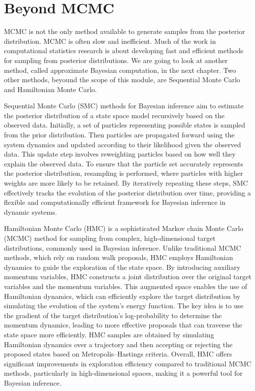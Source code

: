 \documentclass[
]{book}
\theoremstyle{definition}
\theoremstyle{definition}
\theoremstyle{definition}
\theoremstyle{definition}
\theoremstyle{remark}
\begin{document}
\section{Beyond MCMC}\label{beyond-mcmc}

MCMC is not the only method available to generate samples from the posterior distribution. MCMC is often slow and inefficient. Much of the work in computational statistics research is about developing fast and efficient methods for sampling from posterior distributions. We are going to look at another method, called approximate Bayesian computation, in the next chapter. Two other methods, beyound the scope of this module, are Sequential Monte Carlo and Hamiltonian Monte Carlo.

Sequential Monte Carlo (SMC) methods for Bayesian inference aim to estimate the posterior distribution of a state space model recursively based on the observed data. Initially, a set of particles representing possible states is sampled from the prior distribution. Then particles are propagated forward using the system dynamics and updated according to their likelihood given the observed data. This update step involves reweighting particles based on how well they explain the observed data. To ensure that the particle set accurately represents the posterior distribution, resampling is performed, where particles with higher weights are more likely to be retained. By iteratively repeating these steps, SMC effectively tracks the evolution of the posterior distribution over time, providing a flexible and computationally efficient framework for Bayesian inference in dynamic systems.

Hamiltonian Monte Carlo (HMC) is a sophisticated Markov chain Monte Carlo (MCMC) method for sampling from complex, high-dimensional target distributions, commonly used in Bayesian inference. Unlike traditional MCMC methods, which rely on random walk proposals, HMC employs Hamiltonian dynamics to guide the exploration of the state space. By introducing auxiliary momentum variables, HMC constructs a joint distribution over the original target variables and the momentum variables. This augmented space enables the use of Hamiltonian dynamics, which can efficiently explore the target distribution by simulating the evolution of the system's energy function. The key idea is to use the gradient of the target distribution's log-probability to determine the momentum dynamics, leading to more effective proposals that can traverse the state space more efficiently. HMC samples are obtained by simulating Hamiltonian dynamics over a trajectory and then accepting or rejecting the proposed states based on Metropolis--Hastings criteria. Overall, HMC offers significant improvements in exploration efficiency compared to traditional MCMC methods, particularly in high-dimensional spaces, making it a powerful tool for Bayesian inference.
\end{document}
